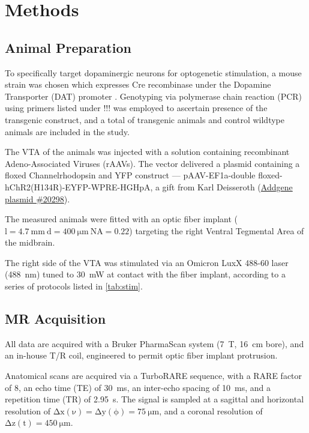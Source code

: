 \section{Methods}

\subsection{Animal Preparation}

To specifically target dopaminergic neurons for optogenetic stimulation, a mouse strain was chosen which expresses Cre recombinase under the Dopamine Transporter (DAT) promoter \cite{Scott2005}.
Genotyping via polymerase chain reaction (PCR) using primers listed under !!! was employed to ascertain presence
of the transgenic construct, and a total of  transgenic animals and  control wildtype animals are included in the study.

The VTA of the animals was injected with a solution containing recombinant Adeno-Associated Viruses (rAAVs).
The vector delivered a plasmid containing a floxed Channelrhodopsin and YFP construct ---
pAAV-EF1a-double floxed-hChR2(H134R)-EYFP-WPRE-HGHpA, a gift from Karl Deisseroth (\href{https://www.addgene.org/20298/}{Addgene plasmid \#20298}).

The measured animals were fitted with an optic fiber implant ($\mathrm{l=\SI{4.7}{\milli\meter} \ d=\SI{400}{\micro\meter} \ NA=0.22}$) targeting the right Ventral Tegmental Area of the midbrain.

The right side of the VTA was stimulated via an Omicron LuxX 488-60 laser (\SI{488}{\nano\meter}) tuned to \SI{30}{\milli\watt} at contact with the fiber implant, according to a series of protocols listed in \cref{tab:stim}.


\subsection{MR Acquisition}

All data are acquired with a Bruker PharmaScan system (\SI{7}{\tesla}, \SI{16}{\centi\meter} bore), and an in-house T/R coil, engineered to permit optic fiber implant protrusion.

Anatomical scans are acquired via a TurboRARE sequence, with a RARE factor of 8, an echo time (TE) of \SI{30}{\milli\second}, an inter-echo spacing of \SI{10}{\milli\second}, and a repetition time (TR) of \SI{2.95}{\second}.
The signal is sampled at a sagittal and horizontal resolution of $\mathrm{\Delta x(\nu)=\Delta y(\phi)=\SI{75}{\micro\meter}}$, and a coronal resolution of $\mathrm{\Delta z(t)=\SI{450}{\micro\meter}}$.

